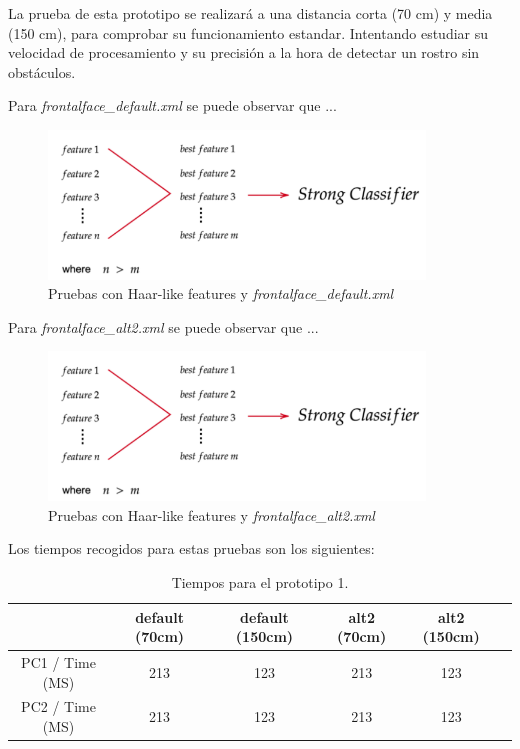 La prueba de esta prototipo se realizará a una distancia corta (70 cm)  y media (150 cm), para comprobar su funcionamiento estandar. Intentando estudiar su velocidad de procesamiento y su precisión a la hora de detectar un rostro sin obstáculos.

Para \textit{frontalface\_default.xml} se puede observar que ...

\begin{figure}[htp]
	\centering
	\includegraphics[width=10cm]{imagenes/ada1.png}
	\caption{Pruebas con Haar-like features y \textit{frontalface\_default.xml}}
	\label{fig:haarDefault}
\end{figure}

Para \textit{frontalface\_alt2.xml} se puede observar que ...

\begin{figure}[htp]
	\centering
	\includegraphics[width=10cm]{imagenes/ada1.png}
	\caption{Pruebas con Haar-like features y \textit{frontalface\_alt2.xml}}
	\label{fig:haarAlt2}
\end{figure}

Los tiempos recogidos para estas pruebas son los siguientes:

\begin{table}[h!]
	\begin{center}
		\begin{tabular}{ |c|c|c|c|c|c| } 
			\hline
			& default (70cm) & default (150cm) & alt2 (70cm) & alt2 (150cm) \\
			\hline
			PC1 / Time (MS) & 213  & 123 & 213  & 123 \\
			\hline
			PC2 / Time (MS) & 213  & 123 & 213  & 123 \\
			\hline
		\end{tabular}
		\caption{Tiempos para el prototipo 1.}
		\label{tab:table2}
	\end{center}
\end{table}

